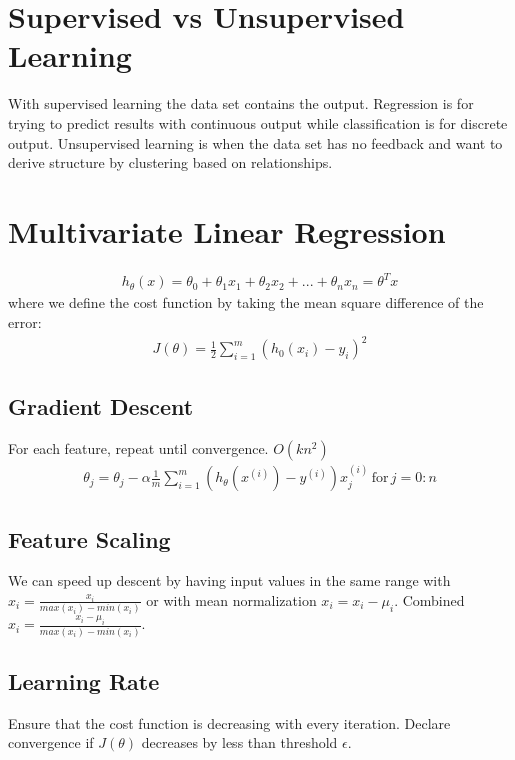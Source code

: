 \documentclass[12pt]{article}
\begin{document}
	\maketitle
	
\section{Supervised vs Unsupervised Learning}
With supervised learning the data set contains the output. Regression is for trying to predict results with continuous output while classification is for discrete output. Unsupervised learning is when the data set has no feedback and want to derive structure by clustering based on relationships.

\section{Multivariate Linear Regression}
\begin{align*}
	h_\theta (x) = \theta_0 + \theta_1 x_1 + \theta_2 x_2 + ... + \theta_nx_n = \theta^Tx
\end{align*}
where we define the cost function by taking the mean square difference of the error:
\begin{align*}
	J(\theta)=\frac{1}{2}\sum_{i=1}^{m}(h_0(x_i)-y_i)^2
\end{align*}

\subsection{Gradient Descent}
For each feature, repeat until convergence. $O(kn^2)$
\begin{align*}
	\theta_j = \theta_j - \alpha\frac{1}{m}\sum_{i=1}^{m}(h_\theta (x^{(i)})-y^{(i)})x_j^{(i)}\,\text{for}\, j=0:n
\end{align*}

\subsection{Feature Scaling}
We can speed up descent by having input values in the same range with $x_i = \frac{x_i}{max(x_i)-min(x_i)}$ or with mean normalization $x_i = x_i - \mu_i$.  Combined $x_i = \frac{x_i - \mu_i}{max(x_i)-min(x_i)}$.

\subsection{Learning Rate}
Ensure that the cost function is decreasing with every iteration. Declare convergence if $J(\theta)$ decreases by less than threshold $\epsilon$.
\end{document}

